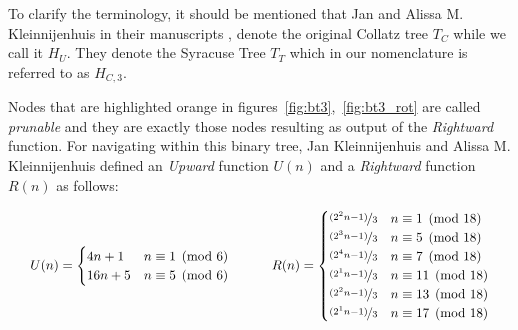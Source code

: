 \vspace{-2em}
\begin{remark}
	To clarify the terminology, it should be mentioned that Jan and Alissa M. Kleinnijenhuis in their manuscripts \cite{Ref_Kleinnijenhuis_2020a}, \cite{Ref_Kleinnijenhuis_2020b} denote the original Collatz tree $T_C$ while we call it $H_U$. They denote the Syracuse Tree $T_T$ which in our nomenclature is referred to as $H_{C,3}$.
\end{remark}

Nodes that are highlighted orange in figures~\ref{fig:bt3},~\ref{fig:bt3_rot} are called \textit{prunable} and they are exactly those nodes resulting as output of the \textit{Rightward} function. For navigating within this binary tree, Jan Kleinnijenhuis and Alissa M. Kleinnijenhuis \cite{Ref_Kleinnijenhuis_2020a} defined an \textit{Upward} function $U(n)$ and a \textit{Rightward} function $R(n)$ as follows:

\begin{equation}
\label{eq:bintree_3_rightward_upward}
\setlength{\arraycolsep}{1.6em}
\begin{array}{cc}
U(n)=\begin{cases}
        4n+1	&	n\equiv 1\pmod 6\\
        16n+5	&	n\equiv 5\pmod 6
    \end{cases} &
R(n)=\begin{cases}
    \nicefrac{(2^2n-1)}{3}	&	n\equiv 1\pmod{18}\\
    \nicefrac{(2^3n-1)}{3}	&	n\equiv 5\pmod{18}\\
    \nicefrac{(2^4n-1)}{3}	&	n\equiv 7\pmod{18}\\
    \nicefrac{(2^1n-1)}{3}	&	n\equiv 11\pmod{18}\\
    \nicefrac{(2^2n-1)}{3}	&	n\equiv 13\pmod{18}\\
    \nicefrac{(2^1n-1)}{3}	&	n\equiv 17\pmod{18}
\end{cases}
\end{array}
\end{equation}

